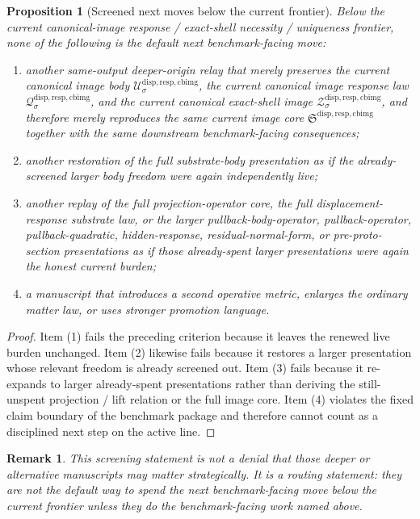 \documentclass[11pt]{article}
\newcommand{\CurrentBodyImageCore}{\mathfrak S^{\mathrm{disp,resp,cbimg}}}
\newcommand{\CanonicalImageBody}[1]{\mathcal U_{#1}^{\mathrm{disp,resp,cbimg}}}
\newcommand{\CanonicalImageShell}[1]{\mathcal Z_{#1}^{\mathrm{disp,resp,cbimg}}}
\newcommand{\CanonicalImageResponseLaw}[1]{\mathscr Q_{#1}^{\mathrm{disp,resp,cbimg}}}
\newtheorem{proposition}{Proposition}
\newtheorem{remark}{Remark}
\begin{document}
\begin{proposition}[Screened next moves below the current frontier]
Below the current canonical-image response / exact-shell necessity / uniqueness frontier, none of the following is the default next benchmark-facing move:
\begin{enumerate}
    \item another same-output deeper-origin relay that merely preserves the current canonical image body \(\CanonicalImageBody{\sigma}\), the current canonical image response law \(\CanonicalImageResponseLaw{\sigma}\), and the current canonical exact-shell image \(\CanonicalImageShell{\sigma}\), and therefore merely reproduces the same current image core \(\CurrentBodyImageCore\) together with the same downstream benchmark-facing consequences;
    \item another restoration of the full substrate-body presentation as if the already-screened larger body freedom were again independently live;
    \item another replay of the full projection-operator core, the full displacement-response substrate law, or the larger pullback-body-operator, pullback-operator, pullback-quadratic, hidden-response, residual-normal-form, or pre-proto-section presentations as if those already-spent larger presentations were again the honest current burden;
    \item a manuscript that introduces a second operative metric, enlarges the ordinary matter law, or uses stronger promotion language.
\end{enumerate}
\end{proposition}

\begin{proof}
Item (1) fails the preceding criterion because it leaves the renewed live burden unchanged. Item (2) likewise fails because it restores a larger presentation whose relevant freedom is already screened out. Item (3) fails because it re-expands to larger already-spent presentations rather than deriving the still-unspent projection / lift relation or the full image core. Item (4) violates the fixed claim boundary of the benchmark package and therefore cannot count as a disciplined next step on the active line.
\end{proof}

\begin{remark}
This screening statement is not a denial that those deeper or alternative manuscripts may matter strategically. It is a routing statement: they are not the default way to spend the next benchmark-facing move below the current frontier unless they do the benchmark-facing work named above.
\end{remark}
\end{document}

